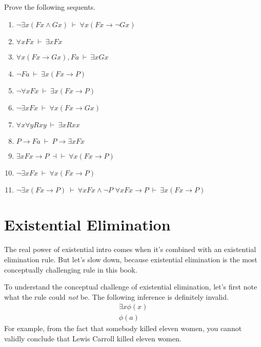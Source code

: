
\begin{exercises} Prove the following sequents. \label{harder} \label{ex:ei}
  \begin{enumerate}
  \item $\neg\exists x (Fx\wedge Gx)\:\vdash\:\forall x(Fx\to \neg Gx)$
  \item $\forall xFx\:\vdash\:\exists xFx$    
  \item $\forall x(Fx\to Gx),Fa\:\vdash\: \exists xGx$
  \item $\neg Fa\:\vdash\:\exists x(Fx\to P)$
  \item $\neg\forall xFx\:\vdash\:\exists x(Fx\to P)$
  \item $\neg \exists xFx\:\vdash\:\forall x(Fx\to Gx)$    
  \item $\forall x\forall yRxy\:\vdash\:\exists xRxx$
  \item $P\to Fa\:\vdash\: P\to \exists xFx$
  \item $\exists xFx\to P\:\dashv\vdash\:\forall x(Fx\to P)$    
  \item $\neg \exists xFx\:\vdash\:\forall x(Fx\to P)$
  \item $\neg \exists x(Fx\to P)\:\vdash\: \forall xFx\wedge\neg P$  
  \sitem $\forall xFx\to P\:\vdash\:\exists x(Fx\to P)$
  \end{enumerate}
\end{exercises}

\section*{Existential Elimination}


The real power of existential intro comes when it's combined with an
existential elimination rule.  But let's slow down, because existential
elimination is the most conceptually challenging rule in this book.

To understand the conceptual challenge of existential elimination,
let's first note what the rule could {\it not} be.  The following
inference is definitely invalid.
\[ \begin{array}{c} \exists x\phi (x) \\ \hline \phi
    (a) \end{array} \] For example, from the fact that somebody killed
eleven women, you cannot validly conclude that Lewis Carroll killed
eleven women.  

